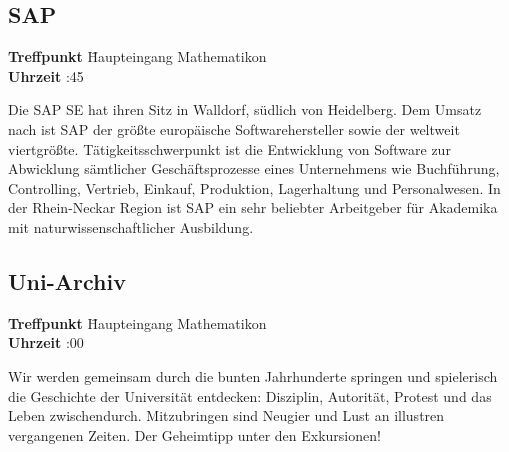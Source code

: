 \hochruecken
\subsection*{SAP}
\begin{tabbing}
\textbf{Treffpunkt} \quad \quad \quad \= Haupteingang Mathematikon\\
\textbf{Uhrzeit} :45
\end{tabbing}
\hochruecken
Die SAP SE hat ihren Sitz in Walldorf, südlich von Heidelberg. Dem Umsatz nach ist SAP der größte europäische Softwarehersteller sowie der weltweit viertgrößte. Tätigkeitsschwerpunkt ist die Entwicklung von Software zur Abwicklung sämtlicher Geschäftsprozesse eines Unternehmens wie Buchführung, Controlling, Vertrieb, Einkauf, Produktion, Lagerhaltung und Personalwesen. In der Rhein-Neckar Region ist SAP ein sehr beliebter Arbeitgeber für Akademika mit naturwissenschaftlicher Ausbildung. 

\hochruecken
\subsection*{Uni-Archiv}
\begin{tabbing}
\textbf{Treffpunkt} \quad \quad \quad \= Haupteingang Mathematikon\\
\textbf{Uhrzeit} :00
\end{tabbing}
\hochruecken
Wir werden gemeinsam durch die bunten Jahrhunderte springen und \glqq spielerisch\grqq{} die Geschichte der Universität entdecken: Disziplin, Autorität, Protest und das Leben zwischendurch. Mitzubringen sind Neugier und Lust an illustren vergangenen Zeiten. Der Geheimtipp unter den Exkursionen! 

\hochruecken
